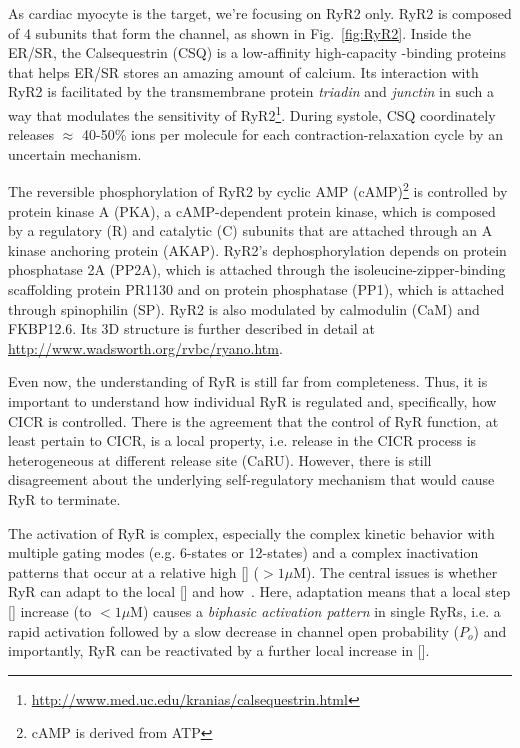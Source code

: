 As cardiac myocyte is the target, we're focusing on RyR2 only. RyR2 is
composed of 4 subunits that form the channel, as shown in
Fig.~\ref{fig:RyR2}.  Inside the ER/SR, the Calsequestrin (CSQ) is a
low-affinity high-capacity -binding proteins that helps
ER/SR stores an amazing amount of calcium. Its interaction with RyR2
is facilitated by the transmembrane protein {\it triadin} and
{\it junctin} in such a way that modulates the sensitivity of
RyR2\footnote{\url{http://www.med.uc.edu/kranias/calsequestrin.html}}. During
systole, CSQ coordinately releases $\approx$ 40-50\%  ions
per molecule for each contraction-relaxation cycle by an uncertain
mechanism.

The reversible phosphorylation of RyR2 by cyclic AMP
(cAMP)\footnote{cAMP is derived from ATP} is controlled by protein
kinase A (PKA), a cAMP-dependent protein kinase, which is composed by
a regulatory (R) and catalytic (C) subunits that are attached through
an A kinase anchoring protein (AKAP).  RyR2's dephosphorylation
depends on protein phosphatase 2A (PP2A), which is attached through
the isoleucine-zipper-binding scaffolding protein PR1130 and on
protein phosphatase (PP1), which is attached through spinophilin (SP).
RyR2 is also modulated by calmodulin (CaM) and FKBP12.6. Its 3D
structure is further described in detail at
\url{http://www.wadsworth.org/rvbc/ryano.htm}.

Even now, the understanding of RyR is still far from
completeness. Thus, it is important to understand how individual RyR
is regulated and, specifically, how CICR is controlled. There is the
agreement that the control of RyR function, at least pertain to CICR,
is a local property, i.e.  release in the CICR process is
heterogeneous at different release site (CaRU). However, there is
still disagreement about the underlying self-regulatory mechanism that
would cause RyR to terminate.

The activation of RyR is complex, especially the complex kinetic
behavior with multiple gating modes (e.g. 6-states or 12-states) and a
complex inactivation patterns that occur at a relative high
[] ($>1\mu$M). The central issues is whether RyR can adapt
to the local [] and how~\citep{gyorke1993ryr}. Here,
adaptation means that a local step [] increase (to $<1\mu$M)
causes a {\it biphasic activation pattern} in single RyRs, i.e. a
rapid activation followed by a slow decrease in channel open
probability ($P_o$) and importantly, RyR can be reactivated by a
further local increase in [].


